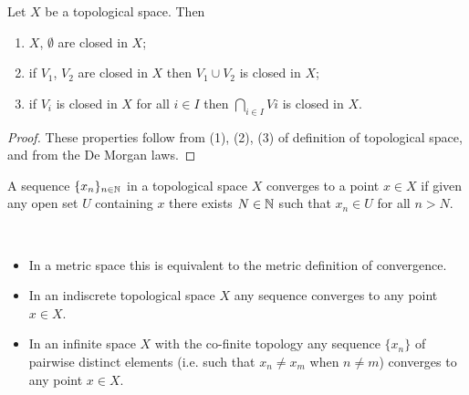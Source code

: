 \begin{proposition}
Let $X$ be a topological space. Then
\begin{enumerate}[label=(\arabic*)]
\item $X$, $\emptyset$ are closed in $X$;
\item if $V_1$, $V_2$ are closed in $X$ then $V_1\cup V_2$ is closed in $X$;
\item if $V_i$ is closed in $X$ for all $i\in I$ then $\bigcap_{i\in I}Vi$ is closed in $X$.
\end{enumerate}
\end{proposition}

\begin{proof}
These properties follow from (1), (2), (3) of definition of topological space, and from the De Morgan laws.
\end{proof}

\begin{definition}
A sequence $\{x_n\}_{n\in\mathbb N}$ in a topological space $X$ converges to a point $x\in X$ if given any open set $U$ containing $x$ there exists $N\in\mathbb N$ such that $x_n\in U$ for all $n>N$.
\end{definition}

\begin{example} \
\begin{itemize}
\item In a metric space this is equivalent to the metric definition of convergence.
\item In an indiscrete topological space $X$ any sequence converges to any point $x\in X$.
\item In an infinite space $X$ with the co-finite topology any sequence $\{x_n\}$ of pairwise distinct elements (i.e. such that $x_n\neq x_m$ when $n\neq m$) converges to any point $x\in X$.
\end{itemize}
\end{example}





